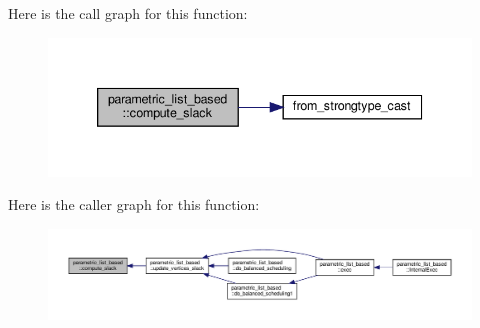 Here is the call graph for this function\+:
\nopagebreak
\begin{figure}[H]
\begin{center}
\leavevmode
\includegraphics[width=339pt]{d7/d47/classparametric__list__based_aa040a68024272d93c52aed13f00881bf_cgraph}
\end{center}
\end{figure}
Here is the caller graph for this function\+:
\nopagebreak
\begin{figure}[H]
\begin{center}
\leavevmode
\includegraphics[width=350pt]{d7/d47/classparametric__list__based_aa040a68024272d93c52aed13f00881bf_icgraph}
\end{center}
\end{figure}
\mbox{\label{classparametric__list__based_aea554a314bf6dd38be5cc93a617cea30}} 
